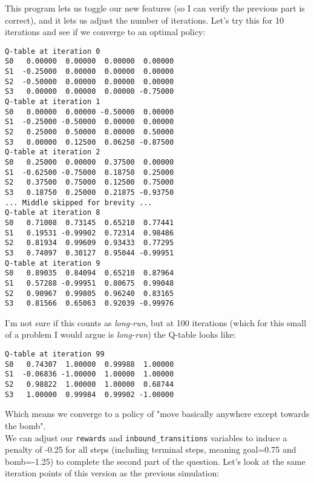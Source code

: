 \documentclass{exam}
\begin{document}
This program lets us toggle our new features (so I can verify the previous part is correct), and it lets us adjust the number of iterations. Let's try this for 10 iterations and see if we converge to an optimal policy:

\begin{verbatim}
Q-table at iteration 0
S0	 0.00000  0.00000  0.00000  0.00000
S1	-0.25000  0.00000  0.00000  0.00000
S2	-0.50000  0.00000  0.00000  0.00000
S3	 0.00000  0.00000  0.00000 -0.75000
Q-table at iteration 1
S0	 0.00000  0.00000 -0.50000  0.00000
S1	-0.25000 -0.50000  0.00000  0.00000
S2	 0.25000  0.50000  0.00000  0.50000
S3	 0.00000  0.12500  0.06250 -0.87500
Q-table at iteration 2
S0	 0.25000  0.00000  0.37500  0.00000
S1	-0.62500 -0.75000  0.18750  0.25000
S2	 0.37500  0.75000  0.12500  0.75000
S3	 0.18750  0.25000  0.21875 -0.93750
... Middle skipped for brevity ...
Q-table at iteration 8
S0	 0.71008  0.73145  0.65210  0.77441
S1	 0.19531 -0.99902  0.72314  0.98486
S2	 0.81934  0.99609  0.93433  0.77295
S3	 0.74097  0.30127  0.95044 -0.99951
Q-table at iteration 9
S0	 0.89035  0.84094  0.65210  0.87964
S1	 0.57288 -0.99951  0.80675  0.99048
S2	 0.90967  0.99805  0.96240  0.83165
S3	 0.81566  0.65063  0.92039 -0.99976
\end{verbatim}

I'm not sure if this counts as \textit{long-run}, but at 100 iterations (which for this small of a problem I would argue is \textit{long-run}) the Q-table looks like:

\begin{verbatim}
Q-table at iteration 99
S0	 0.74307  1.00000  0.99988  1.00000
S1	-0.06836 -1.00000  1.00000  1.00000
S2	 0.98822  1.00000  1.00000  0.68744
S3	 1.00000  0.99984  0.99902 -1.00000
\end{verbatim}

Which means we converge to a policy of "move basically anywhere except towards the bomb".\\

We can adjust our \texttt{rewards} and \texttt{inbound\_transitions} variables to induce a penalty of -0.25 for all steps (including terminal steps, meaning goal=0.75 and bomb=-1.25) to complete the second part of the question. Let's look at the same iteration points of this version as the previous simulation:
\end{document}
